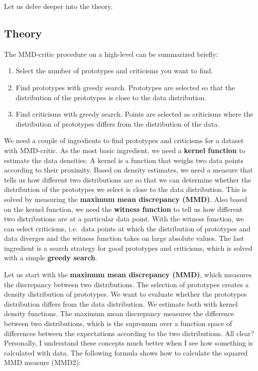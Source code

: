 \documentclass[
  12pt,
]{krantz}
\providecommand{\tightlist}{%
  \setlength{\itemsep}{0pt}\setlength{\parskip}{0pt}}
\begin{document}
Let us delve deeper into the theory.

\hypertarget{theory-5}{%
\subsection{Theory}\label{theory-5}}

The MMD-critic procedure on a high-level can be summarized briefly:

\begin{enumerate}
\def\labelenumi{\arabic{enumi}.}
\tightlist
\item
  Select the number of prototypes and criticisms you want to find.
\item
  Find prototypes with greedy search.
  Prototypes are selected so that the distribution of the prototypes is close to the data distribution.
\item
  Find criticisms with greedy search.
  Points are selected as criticisms where the distribution of prototypes differs from the distribution of the data.
\end{enumerate}

We need a couple of ingredients to find prototypes and criticisms for a dataset with MMD-critic.
As the most basic ingredient, we need a \textbf{kernel function} to estimate the data densities.
A kernel is a function that weighs two data points according to their proximity.
Based on density estimates, we need a measure that tells us how different two distributions are so that we can determine whether the distribution of the prototypes we select is close to the data distribution.
This is solved by measuring the \textbf{maximum mean discrepancy (MMD)}.
Also based on the kernel function, we need the \textbf{witness function} to tell us how different two distributions are at a particular data point.
With the witness function, we can select criticisms, i.e.~data points at which the distribution of prototypes and data diverges and the witness function takes on large absolute values.
The last ingredient is a search strategy for good prototypes and criticisms, which is solved with a simple \textbf{greedy search}.

Let us start with the \textbf{maximum mean discrepancy (MMD)}, which measures the discrepancy between two distributions.
The selection of prototypes creates a density distribution of prototypes.
We want to evaluate whether the prototypes distribution differs from the data distribution.
We estimate both with kernel density functions.
The maximum mean discrepancy measures the difference between two distributions, which is the supremum over a function space of differences between the expectations according to the two distributions.
All clear?
Personally, I understand these concepts much better when I see how something is calculated with data.
The following formula shows how to calculate the squared MMD measure (MMD2):
\end{document}
